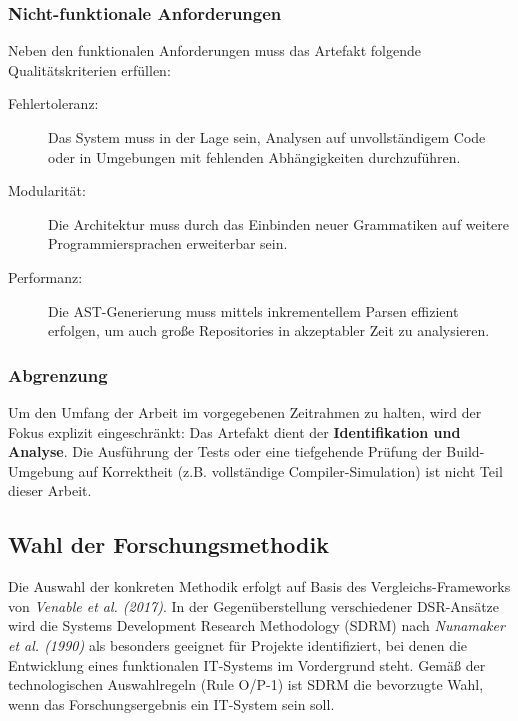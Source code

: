 \documentclass[12pt,titlepage]{article}
\begin{document}
\subsubsection{Nicht-funktionale Anforderungen}
\label{subsec:nicht-funktionale-anforderungen}

Neben den funktionalen Anforderungen muss das Artefakt folgende Qualitätskriterien erfüllen:

\begin{description}
    \item[Fehlertoleranz:] Das System muss in der Lage sein, Analysen auf unvollständigem Code oder in Umgebungen mit fehlenden Abhängigkeiten durchzuführen.
    \item[Modularität:] Die Architektur muss durch das Einbinden neuer Grammatiken auf weitere Programmiersprachen erweiterbar sein.
    \item[Performanz:] Die AST-Generierung muss mittels inkrementellem Parsen effizient erfolgen, um auch große Repositories in akzeptabler Zeit zu analysieren.
\end{description}

\subsubsection{Abgrenzung}
\label{subsec:abgrenzung}

Um den Umfang der Arbeit im vorgegebenen Zeitrahmen zu halten, wird der Fokus explizit eingeschränkt: Das Artefakt dient der \textbf{Identifikation und Analyse}. Die Ausführung der Tests oder eine tiefgehende Prüfung der Build-Umgebung auf Korrektheit (z.B. vollständige Compiler-Simulation) ist nicht Teil dieser Arbeit.
\subsection{Wahl der Forschungsmethodik}
Die Auswahl der konkreten Methodik erfolgt auf Basis des Vergleichs-Frameworks von \textit{Venable et al. (2017)}\cite{Venable_Pries-Heje_Baskerville_2017}. In der Gegenüberstellung verschiedener DSR-Ansätze wird die Systems Development Research Methodology (SDRM) nach \textit{Nunamaker et al. (1990)}\cite{Nunamaker_Chen_1990} als besonders geeignet für Projekte identifiziert, bei denen die Entwicklung eines funktionalen IT-Systems im Vordergrund steht. Gemäß der technologischen Auswahlregeln (Rule O/P-1) ist SDRM die bevorzugte Wahl, wenn das Forschungsergebnis ein IT-System sein soll.
\end{document}
